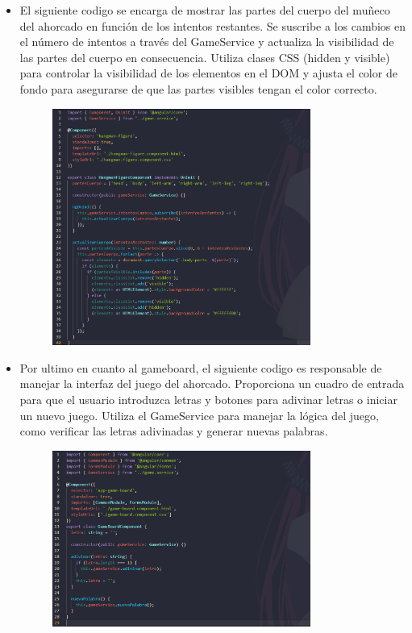 \documentclass{article}
\begin{document}
\begin{itemize}
		\item El siguiente codigo se encarga de mostrar las partes del cuerpo del muñeco del ahorcado en función de los intentos restantes. Se suscribe a los cambios en el número de intentos a través del GameService y actualiza la visibilidad de las partes del cuerpo en consecuencia. Utiliza clases CSS (hidden y visible) para controlar la visibilidad de los elementos en el DOM y ajusta el color de fondo para asegurarse de que las partes visibles tengan el color correcto.
		\begin{figure}[H]
			\centering
			\includegraphics[width=0.8\textwidth,keepaspectratio]{img/game3.png}		
		\end{figure}
		
		\clearpage
		
		\item Por ultimo en cuanto al gameboard, el siguiente codigo es responsable de manejar la interfaz del juego del ahorcado. Proporciona un cuadro de entrada para que el usuario introduzca letras y botones para adivinar letras o iniciar un nuevo juego. Utiliza el GameService para manejar la lógica del juego, como verificar las letras adivinadas y generar nuevas palabras.
		
		\begin{figure}[H]
			\centering
			\includegraphics[width=0.8\textwidth,keepaspectratio]{img/game4.png}		
		\end{figure}
		
		
		
		
		
	\end{itemize}
\end{document}
